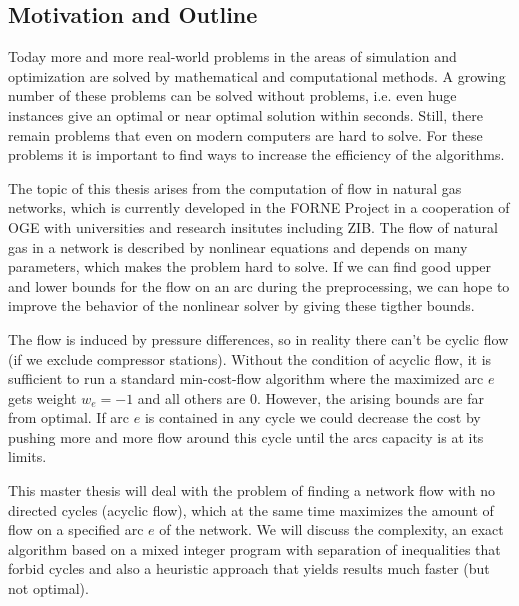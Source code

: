 \subsection{Motivation and Outline}
Today more and more real-world problems in the areas of simulation and optimization are solved by mathematical and 
computational methods. A growing number of these problems can be solved without problems, i.e. even huge instances give 
an optimal or near optimal solution within seconds. Still, there remain problems that even on modern computers are hard 
to solve. For these problems it is important to find ways to increase the efficiency of the algorithms. 

The topic of this thesis arises from the computation of flow in natural gas networks, which is currently developed 
in the FORNE Project in a cooperation of OGE with universities and research insitutes including ZIB.
The flow of natural gas in a network is described by nonlinear equations and depends on many parameters, which makes 
the problem hard to solve. If we can find good upper and lower bounds for the flow on an arc during the preprocessing, 
we can hope to improve the behavior of the nonlinear solver by giving these tigther bounds. 

The flow is induced by pressure differences, so in reality there can't be cyclic flow (if we exclude compressor 
stations). Without the condition of acyclic flow, it is sufficient to run a standard min-cost-flow algorithm where the 
maximized arc $e$ gets weight $w_e = -1$ and all others are 0. However, the arising bounds are far from optimal. If arc 
$e$ is contained in any cycle we could decrease the cost by pushing more and more flow around this cycle until the arcs 
capacity is at its limits.

This master thesis will deal with the problem of finding a network flow with no directed cycles (acyclic flow), which at 
the same time maximizes the amount of flow on a specified arc $e$ of the network. We will discuss the complexity, an 
exact algorithm based on a mixed integer program with separation of inequalities that forbid cycles and also a heuristic 
approach that yields results much faster (but not optimal).%

% 
